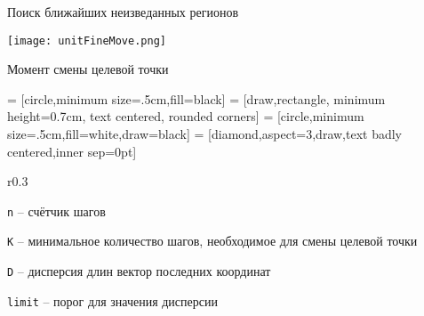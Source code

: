 \begin{tslide}{Поиск ближайших неизведанных регионов}

    \vfill

    \begin{center}
    \texttt{[image: unitFineMove.png]}
    \end{center}

    \vfill

\end{tslide}

\begin{tslide}{Момент смены целевой точки}

     = [circle,minimum size=.5cm,fill=black]
     = [draw,rectangle, minimum height=0.7cm,
                text centered, rounded corners]
     = [circle,minimum size=.5cm,fill=white,draw=black]
     = [diamond,aspect=3,draw,text badly centered,inner sep=0pt]

    \begin{wrapfigure}{r}{0.3\linewidth}

    \end{wrapfigure}

    \verb|n| -- счётчик шагов

    \verb|K| -- минимальное количество шагов, необходимое для смены целевой
                точки

    \verb|D| -- дисперсия длин вектор последних координат

    \verb|limit| -- порог для значения дисперсии

\end{tslide}

